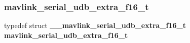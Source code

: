 \subsubsection{mavlink\+\_\+serial\+\_\+udb\+\_\+extra\+\_\+f16\+\_\+t}
{\footnotesize\ttfamily typedef struct \textbf{ \+\_\+\+\_\+mavlink\+\_\+serial\+\_\+udb\+\_\+extra\+\_\+f16\+\_\+t}  \textbf{ mavlink\+\_\+serial\+\_\+udb\+\_\+extra\+\_\+f16\+\_\+t}}

